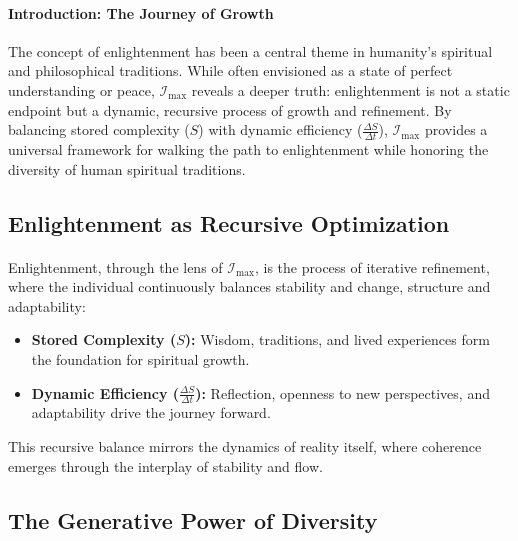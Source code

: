 \documentclass[12pt]{article}
\begin{document}
\paragraph{Introduction: The Journey of Growth}
The concept of enlightenment has been a central theme in humanity’s spiritual and philosophical traditions. While often envisioned as a state of perfect understanding or peace, \(\mathcal{I}_{\text{max}}\) reveals a deeper truth: enlightenment is not a static endpoint but a dynamic, recursive process of growth and refinement. By balancing stored complexity (\(S\)) with dynamic efficiency (\(\frac{\Delta S}{\Delta t}\)), \(\mathcal{I}_{\text{max}}\) provides a universal framework for walking the path to enlightenment while honoring the diversity of human spiritual traditions.

\subsection{Enlightenment as Recursive Optimization}
\paragraph{}
Enlightenment, through the lens of \(\mathcal{I}_{\text{max}}\), is the process of iterative refinement, where the individual continuously balances stability and change, structure and adaptability:
\begin{itemize}
    \item \textbf{Stored Complexity (\(S\)):} Wisdom, traditions, and lived experiences form the foundation for spiritual growth.
    \item \textbf{Dynamic Efficiency (\(\frac{\Delta S}{\Delta t}\)):} Reflection, openness to new perspectives, and adaptability drive the journey forward.
\end{itemize}
This recursive balance mirrors the dynamics of reality itself, where coherence emerges through the interplay of stability and flow.

\subsection{The Generative Power of Diversity}
\end{document}
